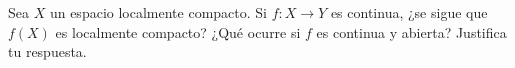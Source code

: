 \item Sea $X$ un espacio localmente compacto. Si $f: X \rightarrow Y$ es continua, ¿se sigue que $f(X)$ es localmente compacto? ¿Qué ocurre si $f$ es continua y abierta? Justifica tu respuesta.

